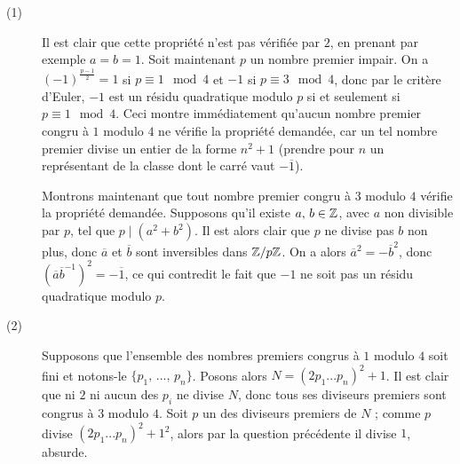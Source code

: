 \begin{sol}

\begin{description}

\item[(1)]Il est clair que cette propri\'et\'e n'est pas v\'erifi\'ee par $2$, en prenant par exemple $a = b = 1$. Soit maintenant $p$ un nombre premier impair. On a $(- 1)^{\frac{p - 1}{2}} = 1$ si $p \equiv 1 \mod 4$ et $-1$ si $p \equiv 3 \mod 4$, donc par le crit\`ere d'Euler, $- 1$ est un r\'esidu quadratique modulo $p$ si et seulement si $p \equiv 1 \mod 4$. Ceci montre imm\'ediatement qu'aucun nombre premier congru \`a $1$ modulo $4$ ne v\'erifie la propri\'et\'e demand\'ee, car un tel nombre premier divise un entier de la forme $n^2 + 1$ (prendre pour $n$ un repr\'esentant de la classe dont le carr\'e vaut $-\overline{1}$).

\smallskip

Montrons maintenant que tout nombre premier congru \`a $3$ modulo $4$ v\'erifie la propri\'et\'e demand\'ee. Supposons qu'il existe $a, \, b \in \mathbb Z$, avec $a$ non divisible par $p$, tel que $p \mid (a^2 + b^2)$. Il est alors clair que $p$ ne divise pas $b$ non plus, donc $\overline{a}$ et $\overline{b}$ sont inversibles dans $\mathbb Z/p\mathbb Z$. On a alors $\overline{a}^2 = - \overline{b}^2$, donc $(\overline{a}\overline{b}^{- 1})^2 = - \overline{1}$, ce qui contredit le fait que $- 1$ ne soit pas un r\'esidu quadratique modulo $p$.

\item[(2)]Supposons que l'ensemble des nombres premiers congrus \`a $1$ modulo $4$ soit fini et notons-le $\{p_1, \, ..., \, p_n\}$. Posons alors $N = (2p_1...p_n)^2 + 1$. Il est clair que ni $2$ ni aucun des $p_i$ ne divise $N$, donc tous ses diviseurs premiers sont congrus \`a $3$ modulo $4$. Soit $p$ un des diviseurs premiers de $N$ ; comme $p$ divise $(2p_1...p_n)^2 + 1^2$, alors par la question pr\'ec\'edente il divise $1$, absurde.

\end{description}

\end{sol}


